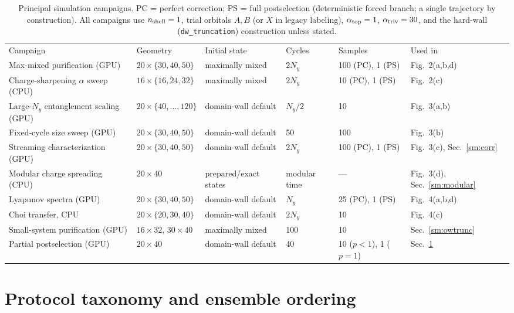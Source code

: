 \documentclass[aps,prl,onecolumn,superscriptaddress,nofootinbib]{revtex4-2}
\newcommand{\nsh}{n_{\rm shell}}
\newcommand{\atopo}{\alpha_{\rm top}}
\newcommand{\atriv}{\alpha_{\rm triv}}
\begin{document}
\begin{table}[h]
\caption{\label{tab:params}Principal simulation campaigns.  PC = perfect correction; PS = full postselection (deterministic forced branch; a single trajectory by construction).  All campaigns use $\nsh=1$, trial orbitals $A,B$ (or $X$ in legacy labeling), $\atopo=1$, $\atriv=30$, and the hard-wall (\texttt{dw\_truncation}) construction unless stated.}
\begin{ruledtabular}
\begin{tabular}{llllll}
Campaign & Geometry & Initial state & Cycles & Samples & Used in \\
\colrule
Max-mixed purification (GPU) & $20\times\{30,40,50\}$ & maximally mixed & $2N_y$ & 100 (PC), 1 (PS) & Fig.~2(a,b,d) \\
Charge-sharpening $\alpha$ sweep (CPU) & $16\times\{16,24,32\}$ & maximally mixed & $2N_y$ & 10 (PC), 1 (PS) & Fig.~2(c) \\
Large-$N_y$ entanglement scaling (GPU) & $20\times\{40,\dots,120\}$ & domain-wall default & $N_y/2$ & 10 & Fig.~3(a,b) \\
Fixed-cycle size sweep (GPU) & $20\times\{30,40,50\}$ & domain-wall default & 50 & 100 & Fig.~3(b) \\
Streaming characterization (GPU) & $20\times\{30,40,50\}$ & domain-wall default & $2N_y$ & 100 (PC), 1 (PS) & Fig.~3(c), Sec.~\ref{sm:corr} \\
Modular charge spreading (CPU) & $20\times40$ & prepared/exact states & modular time & --- & Fig.~3(d), Sec.~\ref{sm:modular} \\
Lyapunov spectra (GPU) & $20\times\{30,40,50\}$ & domain-wall default & $N_y$ & 25 (PC), 1 (PS) & Fig.~4(a,b,d) \\
Choi transfer, CPU & $20\times\{20,30,40\}$ & domain-wall default & $2N_y$ & 10 & Fig.~4(c) \\
Small-system purification (GPU) & $16\times32$, $30\times40$ & maximally mixed & 100 & 10 & Sec.~\ref{sm:owtrunc} \\
Partial postselection (GPU) & $20\times40$ & domain-wall default & 40 & 10 ($p<1$), 1 ($p=1$) & Sec.~\ref{sm:taxonomy} \\
\end{tabular}
\end{ruledtabular}
\end{table}

\section{Protocol taxonomy and ensemble ordering}
\label{sm:taxonomy}
\end{document}
